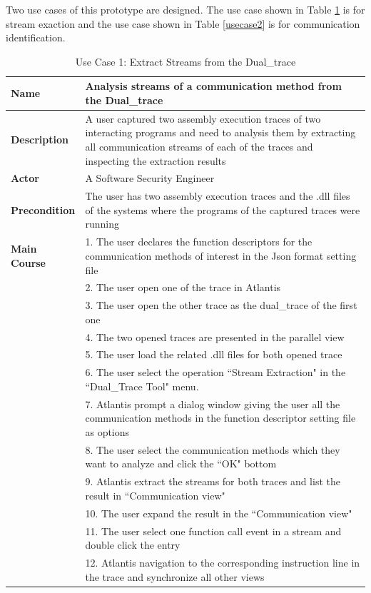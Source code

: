 Two use cases of this prototype are designed. The use case shown in Table \ref{usecase1} is for stream exaction and the use case shown in Table \ref{usecase2} is for communication identification. 

\begin{table}[H]
  \centering
  \caption{Use Case 1: Extract Streams from the Dual\_trace}
  \label{usecase1}
  \begin{tabular}{|l|p{13cm}|}
      \hline
       \textbf{Name} & Analysis streams of a communication method from the Dual\_trace\\
       \hline
       \textbf{Description} & A user captured two assembly execution traces of two interacting programs and need to analysis them by extracting all communication streams of each of the traces and inspecting the extraction results \\
       \hline
              \textbf{Actor} & A Software Security Engineer \\
       \hline
       \textbf{Precondition} & The user has two assembly execution traces and the .dll files of the systems where the programs of the captured traces were running\\
       \hline
       \textbf{Main Course}& 1. The user declares the function descriptors for the communication methods of interest in the Json format setting file\\
        & 2. The user open one of the trace in Atlantis\\
       &  3. The user open the other trace as the dual\_trace of the first one\\
       & 4. The two opened traces are presented in the parallel view\\
       & 5. The user load the related .dll files for both opened trace\\
       & 6. The user select the operation ``Stream Extraction" in the ``Dual\_Trace Tool" menu.\\
       & 7. Atlantis prompt a dialog window giving the user all the communication methods in the function descriptor setting file as options\\
       & 8. The user select the communication methods which they want to analyze and click the ``OK" bottom\\
       & 9. Atlantis extract the streams for both traces and list the result in ``Communication view"\\
       & 10. The user expand the result in the ``Communication view"\\
       & 11. The user select one function call event in a stream and double click the entry\\
       & 12. Atlantis navigation to the corresponding instruction line in the trace and synchronize all other views\\
      \hline               
  \end{tabular}
\end{table}

